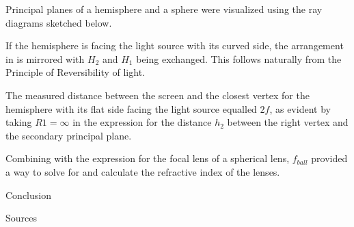 \begin{paper}
	
	Principal planes of a hemisphere and a sphere were visualized using the ray diagrams sketched below.
	
	
	If the hemisphere is facing the light source with its curved side, the arrangement in \figHemisphere is mirrored with \( H_2 \) and \( H_1 \) being exchanged. This follows naturally from the Principle of Reversibility of light. 
	
	
	The measured distance between the screen and the closest vertex for the hemisphere with its flat side facing the light source equalled \( 2f \), as evident by taking \( R1 = \infty \) in the expression for the distance \( h_2 \) between the right vertex and the secondary principal plane.
	
	Combining \eqVertexToSecondary with the expression for the focal lens of a spherical lens, \( f_{ball} \) provided a way to solve for and calculate the refractive index of the lenses.
	
	
	

		Conclusion 


	Sources

\end{paper}


